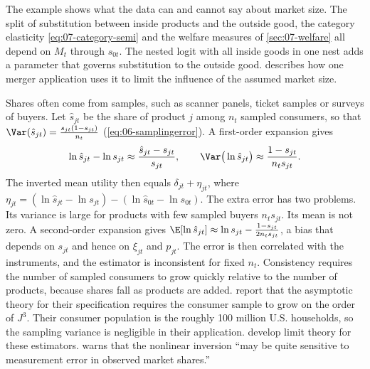 The example shows what the data can and cannot say about market size. The split of substitution between inside
products and the outside good, the category elasticity \eqref{eq:07-category-semi} and the welfare measures of
\cref{sec:07-welfare} all depend on $M_t$ through $s_{0t}$. The nested logit with all inside goods in one nest
adds a parameter that governs substitution to the outside good.  describes how one
merger application uses it to limit the influence of the assumed market size.

Shares often come from samples, such as scanner panels, ticket samples or surveys of buyers. Let $\hat s_{jt}$ be
the share of product $j$ among $n_t$ sampled consumers, so that $\Var(\hat s_{jt}) = \frac{s_{jt}(1 -
s_{jt})}{n_t}$ (\cref{eq:06-samplingerror}). A first-order expansion gives
\begin{equation*}
  \ln\hat s_{jt} - \ln s_{jt} \approx \frac{\hat s_{jt} - s_{jt}}{s_{jt}}, \qquad
  \Var\big(\ln\hat s_{jt}\big) \approx \frac{1 - s_{jt}}{n_t s_{jt}} .
\end{equation*}
The inverted mean utility then equals $\delta_{jt} + \eta_{jt}$, where $\eta_{jt} = (\ln\hat s_{jt} - \ln
s_{jt}) - (\ln\hat s_{0t} - \ln s_{0t})$. The extra error has two problems. Its variance is large for products
with few sampled buyers $n_t s_{jt}$. Its mean is not zero. A second-order expansion gives $\E[\ln\hat s_{jt}]
\approx \ln s_{jt} - \frac{1 - s_{jt}}{2n_t s_{jt}}$, a bias that depends on $s_{jt}$ and hence on $\xi_{jt}$
and $p_{jt}$. The error is then correlated with the instruments, and the estimator is inconsistent for fixed
$n_t$. Consistency requires the number of sampled consumers to grow quickly relative to the number of products,
because shares fall as products are added. \citet[p.~859]{BerryLevinsohnPakes1995} report that the asymptotic
theory for their specification requires the consumer sample to grow on the order of $J^3$. Their consumer
population is the roughly 100 million U.S. households, so the sampling variance is negligible in their
application. \citet*{BerryLintonPakes2004} develop limit theory for these estimators.
\citet[p.~259]{Berry1994} warns that the nonlinear inversion ``may be quite sensitive to measurement error in
observed market shares.''

